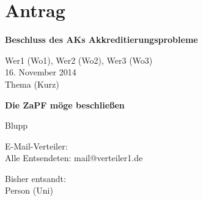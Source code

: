 \section{Antrag}
\textbf{Beschluss des AKs Akkreditierungsprobleme} 

Wer1 (Wo1), Wer2 (Wo2), Wer3 (Wo3) \\
16. November 2014 \\
Thema (Kurz) 

\textbf{Die ZaPF möge beschließen}

Blupp

E-Mail-Verteiler:\\
Alle Entsendeten: mail@verteiler1.de

Bisher entsandt:\\
Person (Uni)